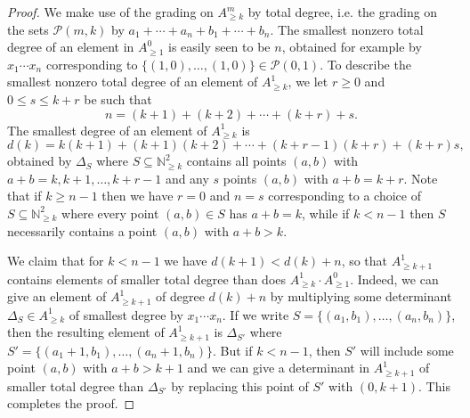 \documentclass[12pt]{amsart}
\newcommand{\N}{\mathbb{N}}
\numberwithin{equation}{section}
\theoremstyle{definition}
\begin{document}
\begin{proof}
    We make use of the grading on $A^m_{\geq k}$ by total degree, i.e. the grading on the sets $\mathcal{P}(m,k)$ by $a_1+\cdots+a_n+b_1+\cdots+b_n$. The smallest nonzero total degree of an element in $A^0_{\geq 1}$ is easily seen to be $n$, obtained for example by $x_1\cdots x_n$ corresponding to $\{(1,0),\dots,(1,0)\} \in \mathcal{P}(0,1)$. To describe the smallest nonzero total degree of an element of $A^1_{\geq k}$, we let $r\geq 0$ and $0\leq s \leq k+r$ be such that
    \[ n = (k+1)+(k+2)+\cdots+(k+r)+s. \]
    The smallest degree of an element of $A^1_{\geq k}$ is 
    \[d(k) = k(k+1)+(k+1)(k+2)+\cdots+(k+r-1)(k+r)+(k+r)s,\]
    obtained by $\Delta_S$ where $S\subseteq \N^2_{\geq k}$ contains all points $(a,b)$ with $a+b = k,k+1,\dots,k+r-1$ and any $s$ points $(a,b)$ with $a+b = k+r$. Note that if $k\geq n-1$ then we have $r=0$ and $n=s$ corresponding to a choice of $S\subseteq \N^2_{\geq k}$ where every point $(a,b)\in S$ has $a+b=k$, while if $k<n-1$ then $S$ necessarily contains a point $(a,b)$ with $a+b>k$.

    We claim that for $k<n-1$ we have $d(k+1)<d(k)+n$, so that $A^1_{\geq k+1}$ contains elements of smaller total degree than does $A^1_{\geq k}\cdot A^0_{\geq 1}$. Indeed, we can give an element of $A^1_{\geq k+1}$ of degree $d(k)+n$ by multiplying some determinant $\Delta_S\in A^1_{\geq k}$ of smallest degree by $x_1\cdots x_n$. If we write $S = \{ (a_1,b_1),\dots,(a_n,b_n)\}$, then the resulting element of $A^1_{\geq k+1}$ is $\Delta_{S'}$ where $S' = \{ (a_1+1,b_1),\dots,(a_n+1,b_n)\}$. But if $k<n-1$, then $S'$ will include some point $(a,b)$ with $a+b>k+1$ and we can give a determinant in $A^1_{\geq k+1}$ of smaller total degree than $\Delta_{S'}$ by replacing this point of $S'$ with $(0,k+1)$. This completes the proof.
\end{proof}
\end{document}
